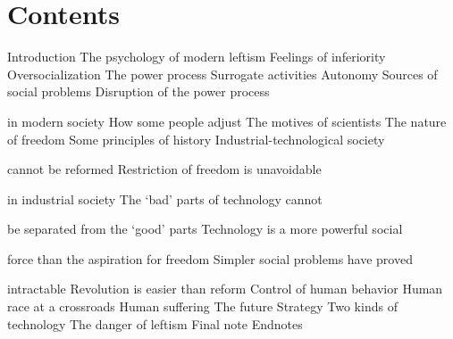 \page[right]
\chapter{Contents}
\def\contentitemspacing{15pt}
Introduction
\blank[\contentitemspacing]
The psychology of modern leftism
\blank[\contentitemspacing]
Feelings of inferiority
\blank[\contentitemspacing]
Oversocialization
\blank[\contentitemspacing]
The power process
\blank[\contentitemspacing]
Surrogate activities
\blank[\contentitemspacing]
Autonomy
\blank[\contentitemspacing]
Sources of social problems
\blank[\contentitemspacing]
Disruption of the power process\par in modern society
\blank[\contentitemspacing]
How some people adjust
\blank[\contentitemspacing]
The motives of scientists
\blank[\contentitemspacing]
The nature of freedom
\blank[\contentitemspacing]
Some principles of history
\blank[\contentitemspacing]
Industrial-technological society\par cannot be reformed
\blank[\contentitemspacing]
Restriction of freedom is unavoidable\par in industrial society
\blank[\contentitemspacing]
The ‘bad’ parts of technology cannot\par be separated from the ‘good’ parts
\blank[\contentitemspacing]
Technology is a more powerful social\par force than the aspiration for freedom
\blank[\contentitemspacing]
Simpler social problems have proved\par intractable
\blank[\contentitemspacing]
Revolution is easier than reform
\blank[\contentitemspacing]
Control of human behavior
\blank[\contentitemspacing]
Human race at a crossroads
\blank[\contentitemspacing]
Human suffering
\blank[\contentitemspacing]
The future
\blank[\contentitemspacing]
Strategy
\blank[\contentitemspacing]
Two kinds of technology
\blank[\contentitemspacing]
The danger of leftism
\blank[\contentitemspacing]
Final note
\blank[\contentitemspacing]
Endnotes
